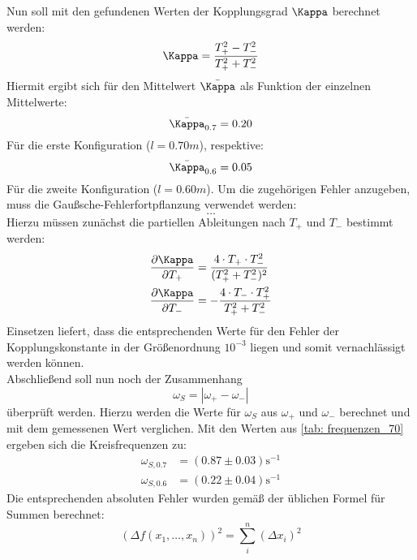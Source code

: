 Nun soll mit den gefundenen Werten der Kopplungsgrad $\Kappa$ berechnet werden:
\begin{equation}
  \Kappa = \frac{T_{+}^2 - T_{-}^2}{T_{+}^2 + T_{-}^2}
\end{equation}
Hiermit ergibt sich für den Mittelwert $\bar{\Kappa}$ als Funktion der einzelnen Mittelwerte:
\begin{equation}
\bar{\Kappa}_{0.7} = 0.20
\end{equation}
Für die erste Konfiguration ($l = 0.70m$), respektive:
\begin{equation}
\bar{\Kappa}_{0.6} = 0.05
\end{equation}
Für die zweite Konfiguration ($l = 0.60m$). Um die zugehörigen Fehler anzugeben, muss die Gaußsche-Fehlerfortpflanzung verwendet werden:
\begin{equation}
  \dots
\end{equation}
Hierzu müssen zunächst die partiellen Ableitungen nach $T_{+}$ und $T_{-}$ bestimmt werden:
\begin{align}
  \frac{\partial \Kappa}{\partial T_{+}} &= \frac{4 \cdot T_{+} \cdot T_{-}^2}{(T_{+}^2 + T_{-}^2)^2} \\
  \frac{\partial \Kappa}{\partial T_{-}} &= - \frac{4 \cdot T_{-} \cdot T_{+}^2 }{T_{+}^2 + T_{-}^2}
\end{align}
Einsetzen liefert, dass die entsprechenden Werte für den Fehler der Kopplungskonstante in der Größenordnung $10^{-3}$ liegen und somit
vernachlässigt werden können. \\
Abschließend soll nun noch der Zusammenhang
\begin{equation}
 \omega_{S} = |\omega_{+} - \omega_{-}|
\end{equation}
überprüft werden. Hierzu werden die Werte für $\omega_{S}$ aus $\omega_{+}$ und $\omega_{-}$ berechnet und mit dem gemessenen Wert verglichen.
Mit den Werten aus \ref{tab: frequenzen_70} ergeben sich die Kreisfrequenzen zu:
\begin{align}
  \omega_{S, 0.7} &= (0.87 \pm 0.03) \si{\second ^{-1}} \\
  \omega_{S, 0.6} &= (0.22 \pm 0.04) \si{\second^{-1}}
\end{align}
Die entsprechenden absoluten Fehler wurden gemäß der üblichen Formel für Summen berechnet:
\begin{equation}
(\Delta f(x_1, \dots ,x_n))^2 = \sum _i^n (\Delta x_i) ^2
\end{equation}



